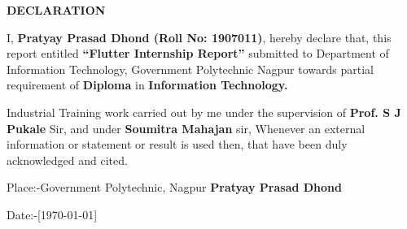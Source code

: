 \begin{center}
{\Large{\bf{DECLARATION}}}
\end{center}

\noindent

I, \textbf{Pratyay Prasad Dhond (Roll No: 1907011)}, hereby declare that, this report entitled \textbf{``Flutter Internship Report”} submitted to Department of Information Technology, Government Polytechnic Nagpur towards
partial requirement of \textbf{ Diploma} in \textbf{Information Technology.} 
\par Industrial Training work carried out by me under the supervision of \textbf{Prof. S J Pukale }Sir, and under \textbf{Soumitra Mahajan} sir, Whenever an external information or statement or result is used then, that have been duly acknowledged and cited.

\vspace{4cm}

\noindent Place:-Government Polytechnic, Nagpur \hfill \textbf{Pratyay Prasad Dhond}

\noindent Date:-[\today]

\clearpage

